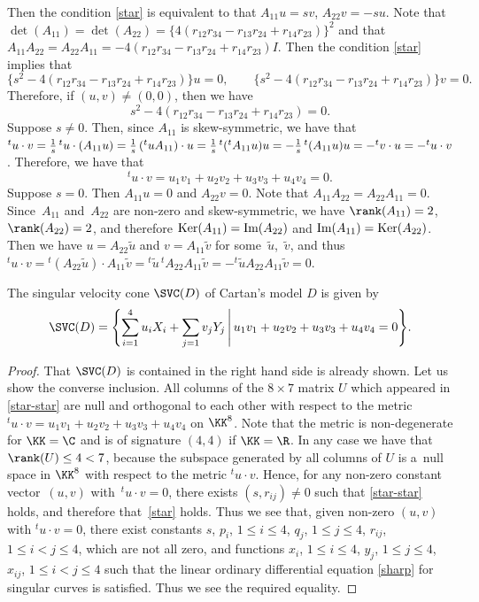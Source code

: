 Then the condition \eqref{star} is equivalent to that
$A_{11}u = sv$, $A_{22}v = -su$. Note that $\det(A_{11}) = \det(A_{22}) = \{4(r_{12}r_{34} - r_{13}r_{24} + r_{14}r_{23})\}^2$
and that
$A_{11}A_{22} = A_{22}A_{11} = -4(r_{12}r_{34} - r_{13}r_{24} + r_{14}r_{23})I$. Then
the condition \eqref{star} implies that
\[
\bigl\{ s^2 - 4(r_{12}r_{34} - r_{13}r_{24} + r_{14}r_{23})\bigr\}u = 0, \qquad \bigl\{ s^2 - 4(r_{12}r_{34} - r_{13}r_{24} + r_{14}r_{23})\bigr\}v = 0.
\]
Therefore, if $(u, v) \not= (0, 0)$, then we have
\[
s^2 - 4(r_{12}r_{34} - r_{13}r_{24} + r_{14}r_{23}) = 0.
\]
Suppose $s \not= 0$. Then, since $A_{11}$ is skew-symmetric, we have that
${}^tu\cdot v = \smash{\frac{1}{s}\,{}^tu\cdot(A_{11}u)} = \smash{\frac{1}{s}\,({}^tuA_{11})\cdot u} = \smash{\frac{1}{s}\,{}^t({}^tA_{11}u)u} = - \smash{\frac{1}{s}\,{}^t(A_{11}u)u} = - {}^tv\cdot u = - {}^tu\cdot v$.
Therefore, we have that
\[
{}^tu \cdot v = u_1v_1 + u_2v_2 + u_3v_3 + u_4v_4 = 0.
\]
Suppose $s = 0$. Then $A_{11}u = 0$ and $A_{22}v = 0$. Note that $A_{11}A_{22} = A_{22}A_{11} = 0$.
Since~$A_{11}$ and~$A_{22}$ are non-zero and skew-symmetric, we have $\rank(A_{11}) = 2$, $\rank(A_{22}) = 2$, and
therefore ${\rm Ker}(A_{11}) = {\mbox{\rm Im}}(A_{22})$ and ${\mbox{\rm Im}}(A_{11}) = {\rm Ker}(A_{22})$.
Then we have $u = A_{22}\tilde{u}$ and $v = A_{11}\tilde{v}$ for some~$\tilde{u}$,~$\tilde{v}$, and thus
${}^tu\cdot v = {}^t(A_{22}\tilde{u})\cdot A_{11}\tilde{v} = {}^t\tilde{u}\,{}^t\!A_{22}A_{11}\tilde{v} = - {}^t\tilde{u}A_{22}A_{11}\tilde{v} = 0$.

\begin{Proposition}
The singular velocity cone $\SVC(D)$ of Cartan's model $D$ is given by
\[
\SVC(D) = \Biggl\{ \sum_{i=1}^4 u_iX_i + \sum_{j=1} v_jY_j \,
\Bigg\vert\, u_1v_1 + u_2v_2 + u_3v_3 + u_4v_4 = 0\Biggr\}.
\]
\end{Proposition}

\begin{proof}
That $\SVC(D)$ is contained in the right hand side is already shown. Let us show the converse inclusion.
All columns of the $8\times 7$ matrix $U$ which appeared in \eqref{star-star} are
null and orthogonal to each other with respect to the metric ${}^tu\cdot v =
u_1v_1 + u_2v_2 + u_3v_3 + u_4v_4$ on $\KK^8$. Note that the metric is non-degenerate for $\KK = \C$
and is of signature $(4, 4)$ if $\KK = \R$.
In any case we have that $\rank(U) \leq 4 < 7$, because the subspace generated by all columns of $U$
is a~null space in $\KK^8$ with respect to the metric ${}^tu\cdot v$.
Hence, for any non-zero constant vector~$(u, v)$ with~${{}^tu\cdot v = 0}$, there exists $(s, r_{ij}) \not= 0$ such that \eqref{star-star} holds, and therefore that~\eqref{star} holds. Thus we see that, given non-zero $(u, v)$ with ${}^tu\cdot v = 0$,
there exist constants $s$, $p_i$, $1 \leq i \leq 4$, $q_j$, $1 \leq j \leq 4$, $r_{ij}$, $1 \leq i < j \leq 4$, which are not all zero,
and functions $x_i$, $1 \leq i \leq 4$, $y_j$, $1 \leq j \leq 4$, $x_{ij}$, $1 \leq i < j \leq 4$
such that the linear ordinary differential equation \eqref{sharp} for singular curves is satisfied.
Thus we see the required equality.
\end{proof}



